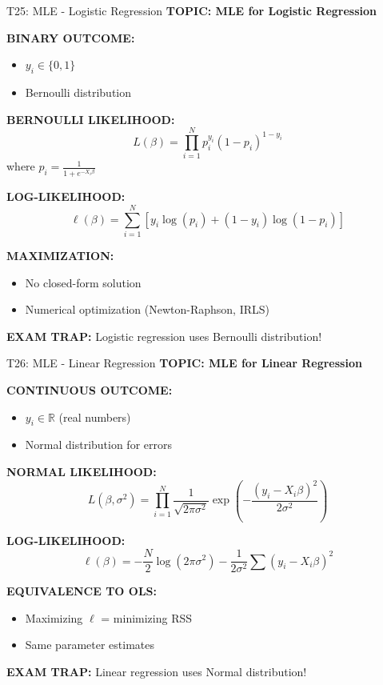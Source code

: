 \documentclass[8pt]{beamer}
\begin{document}
	\begin{frame}{T25: MLE - Logistic Regression}
		\fontsize{6.5}{7.5}\selectfont
		\textbf{TOPIC: MLE for Logistic Regression}
		
		\vspace{0.1cm}
		\textbf{BINARY OUTCOME:}
		\begin{itemize}
			\item $y_i \in \{0, 1\}$
			\item Bernoulli distribution
		\end{itemize}
		
		\vspace{0.1cm}
		\textbf{BERNOULLI LIKELIHOOD:}
		\[
		L(\beta) = \prod_{i=1}^N p_i^{y_i}(1-p_i)^{1-y_i}
		\]
		where $p_i = \frac{1}{1 + e^{-X_i\beta}}$
		
		\vspace{0.1cm}
		\textbf{LOG-LIKELIHOOD:}
		\[
		\ell(\beta) = \sum_{i=1}^N [y_i \log(p_i) + (1-y_i)\log(1-p_i)]
		\]
		
		\vspace{0.1cm}
		\textbf{MAXIMIZATION:}
		\begin{itemize}
			\item No closed-form solution
			\item Numerical optimization (Newton-Raphson, IRLS)
		\end{itemize}
		
		\textcolor{myred}{\textbf{EXAM TRAP:}} Logistic regression uses \textcolor{myblue}{Bernoulli} distribution!
	\end{frame}
	
	\begin{frame}{T26: MLE - Linear Regression}
		\fontsize{6.5}{7.5}\selectfont
		\textbf{TOPIC: MLE for Linear Regression}
		
		\vspace{0.1cm}
		\textbf{CONTINUOUS OUTCOME:}
		\begin{itemize}
			\item $y_i \in \mathbb{R}$ (real numbers)
			\item Normal distribution for errors
		\end{itemize}
		
		\vspace{0.1cm}
		\textbf{NORMAL LIKELIHOOD:}
		\[
		L(\beta, \sigma^2) = \prod_{i=1}^N \frac{1}{\sqrt{2\pi\sigma^2}} \exp\left(-\frac{(y_i - X_i\beta)^2}{2\sigma^2}\right)
		\]
		
		\vspace{0.1cm}
		\textbf{LOG-LIKELIHOOD:}
		\[
		\ell(\beta) = -\frac{N}{2}\log(2\pi\sigma^2) - \frac{1}{2\sigma^2}\sum(y_i - X_i\beta)^2
		\]
		
		\vspace{0.1cm}
		\textbf{EQUIVALENCE TO OLS:}
		\begin{itemize}
			\item Maximizing $\ell$ = minimizing RSS
			\item Same parameter estimates
		\end{itemize}
		
		\textcolor{myred}{\textbf{EXAM TRAP:}} Linear regression uses \textcolor{myblue}{Normal} distribution!
	\end{frame}
	
\end{document}
